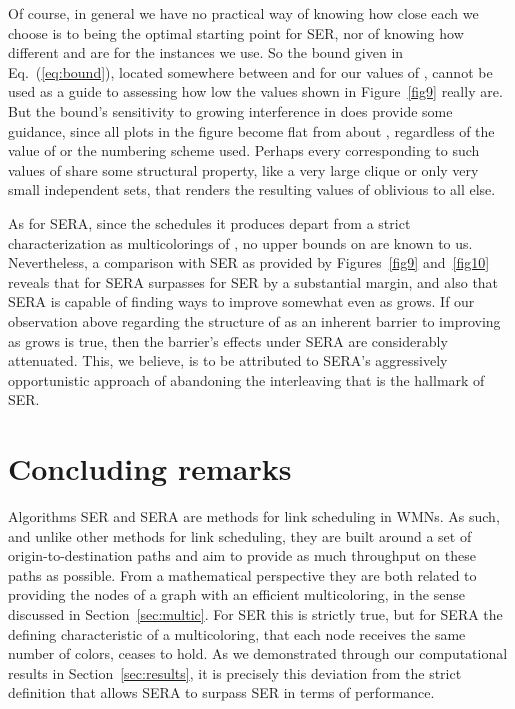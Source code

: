\documentclass{article}
\begin{document}
Of course, in general we have no practical way of knowing how close each
 we choose is to being the optimal starting point for SER, nor of
knowing how different  and  are for the 
instances we use. So the bound given in Eq.~(\ref{eq:bound}), located somewhere
between  and  for our values of ,
cannot be used as a guide to assessing how low the  values
shown in Figure~\ref{fig9} really are. But the bound's sensitivity to growing
interference in  does provide some guidance, since all plots in the figure
become flat from about , regardless of the value of  or the numbering
scheme used. Perhaps every  corresponding to such values of  share some
structural property, like a very large clique or only very small independent
sets, that renders the resulting values of  oblivious to all
else.

As for SERA, since the schedules it produces depart from a strict
characterization as multicolorings of , no upper bounds on 
are known to us. Nevertheless, a comparison with SER as provided by
Figures~\ref{fig9} and~\ref{fig10} reveals that  for SERA
surpasses  for SER by a substantial margin, and also that SERA
is capable of finding ways to improve  somewhat even as 
grows. If our observation above regarding the structure of  as an inherent
barrier to improving  as  grows is true, then the barrier's
effects under SERA are considerably attenuated. This, we believe, is to be
attributed to SERA's aggressively opportunistic approach of abandoning the
interleaving that is the hallmark of SER.

\section{Concluding remarks}\label{sec:concl}

Algorithms SER and SERA are methods for link scheduling in WMNs. As such, and
unlike other methods for link scheduling, they are built around a set of
origin-to-destination paths and aim to provide as much throughput on these paths
as possible. From a mathematical perspective they are both related to providing
the nodes of a graph with an efficient multicoloring, in the sense discussed in
Section~\ref{sec:multic}. For SER this is strictly true, but for SERA the
defining characteristic of a multicoloring, that each node receives the same
number of colors, ceases to hold. As we demonstrated through our computational
results in Section~\ref{sec:results}, it is precisely this deviation from the
strict definition that allows SERA to surpass SER in terms of performance.
\end{document}
